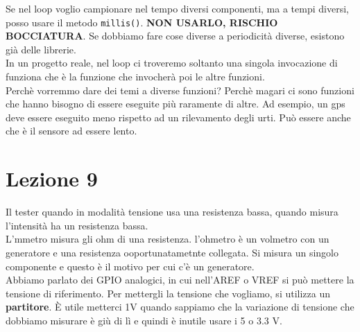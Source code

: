 \documentclass{article}
\begin{document}
Se nel loop voglio campionare nel tempo diversi componenti, ma a tempi diversi, posso usare il metodo \texttt{millis()}. \textbf{NON USARLO, RISCHIO BOCCIATURA}. Se dobbiamo fare cose diverse a periodicità diverse, esistono già delle librerie.
\\ In un progetto reale, nel loop ci troveremo soltanto una singola invocazione di funziona che è la funzione che invocherà poi le altre funzioni.
\\ Perchè vorremmo dare dei temi a diverse funzioni? Perchè magari ci sono funzioni che hanno bisogno di essere eseguite più raramente di altre. Ad esempio, un gps deve essere eseguito meno rispetto ad un rilevamento degli urti. Può essere anche che è il sensore ad essere lento.
\section{Lezione 9}
Il tester quando in modalità tensione usa una resistenza bassa, quando misura l'intensità ha un resistenza bassa.
\\ L'mmetro misura gli ohm di una resistenza. l'ohmetro è un volmetro con un generatore e una resistenza ooportunatametnte collegata. Si misura un singolo componente e questo è il motivo per cui c'è un generatore.
\\ Abbiamo parlato dei GPIO analogici, in cui nell'AREF o VREF si può mettere la tensione di riferimento. Per mettergli la tensione che vogliamo, si utilizza un \textbf{partitore}. È utile metterci 1V quando sappiamo che la variazione di tensione che dobbiamo misurare è giù di lì e quindi è inutile usare i 5 o 3.3 V.
\end{document}
